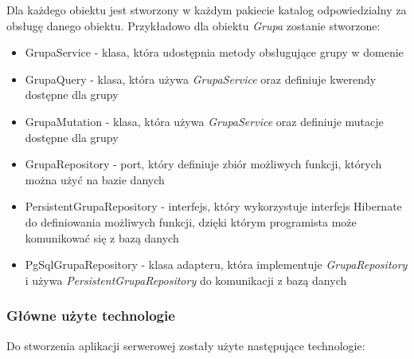 Dla każdego obiektu jest stworzony w każdym pakiecie katalog odpowiedzialny za obsługę danego obiektu. Przykładowo dla obiektu \emph{Grupa} zostanie stworzone:
\begin{itemize}
  \item GrupaService - klasa, która udostępnia metody obsługujące grupy w domenie
  \item GrupaQuery - klasa, która używa \emph{GrupaService} oraz definiuje kwerendy dostępne dla grupy
  \item GrupaMutation - klasa, która używa \emph{GrupaService} oraz definiuje mutacje dostępne dla grupy
  \item GrupaRepository - port, który definiuje zbiór możliwych funkcji, których można użyć na bazie danych
  \item PersistentGrupaRepository - interfejs, który wykorzystuje interfejs Hibernate do definiowania możliwych funkcji, dzięki którym programista może komunikować się z bazą danych
  \item PgSqlGrupaRepository - klasa adapteru, która implementuje \emph{GrupaRepository} i używa \emph{PersistentGrupaRepository} do komunikacji z bazą danych
\end{itemize}

\subsubsection{Główne użyte technologie}
Do stworzenia aplikacji serwerowej zostały użyte następujące technologie:

